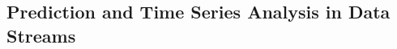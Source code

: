 


\subsection{Prediction and Time Series Analysis in Data Streams}
\label{subsec_timeSeriesAnalysis}

